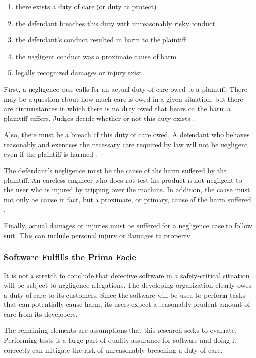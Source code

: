 \singlespace
\begin{enumerate}
 \item there exists a duty of care (or duty to protect)
 \item the defendant breaches this duty with unreasonably risky conduct
 \item the defendant's conduct resulted in harm to the plaintiff
 \item the negligent conduct was a proximate cause of harm
 \item legally recognized damages or injury exist
\end{enumerate}
\doublespace

First, a negligence case calls for an actual duty of care owed to a plaintiff.
There may be a question about how much care is owed in a given situation, but
there are circumstances in which there is no duty owed that bears on the harm a
plaintiff suffers. Judges decide whether or not this duty exists \cite{Dobbs01}.

Also, there must be a breach of this duty of care owed. A defendant who behaves
reasonably and exercises the necessary care required by law will not be
negligent even if the plaintiff is harmed \cite{Dobbs01}.

The defendant's negligence must be the cause of the harm suffered by the
plaintiff. An careless engineer who does not test his product is not negligent
to the user who is injured by tripping over the machine. In addition, the cause
must not only be cause in fact, but a proximate, or primary, cause of the harm
suffered \cite{Dobbs01}.

Finally, actual damages or injuries must be suffered for a negligence case to
follow suit. This can include personal injury or damages to property
\cite{Dobbs01}.

\subsubsection{Software Fulfills the Prima Facie}

It is not a stretch to conclude that defective software in a safety-critical
situation will be subject to negligence allegations. The developing
organization clearly owes a duty of care to its customers. Since the software
will be used to perform tasks that can potentially cause harm, its users expect
a reasonably prudent amount of care from its developers.

The remaining elements are assumptions that this research seeks to evaluate.
Performing tests is a large part of quality assurance for software and doing it
correctly can mitigate the risk of unreasonably breaching a duty of care.

